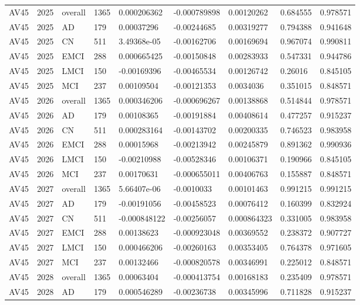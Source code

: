 \begin{landscape}
\begin{longtable}{lllllllll}
AV45 & 2025 & overall & 1365 & 0.000206362 & -0.000789898 & 0.00120262 & 0.684555 & 0.978571 \\
AV45 & 2025 & AD & 179 & 0.00037296 & -0.00244685 & 0.00319277 & 0.794388 & 0.941648 \\
AV45 & 2025 & CN & 511 & 3.49368e-05 & -0.00162706 & 0.00169694 & 0.967074 & 0.990811 \\
AV45 & 2025 & EMCI & 288 & 0.000665425 & -0.00150848 & 0.00283933 & 0.547331 & 0.944786 \\
AV45 & 2025 & LMCI & 150 & -0.00169396 & -0.00465534 & 0.00126742 & 0.26016 & 0.845105 \\
AV45 & 2025 & MCI & 237 & 0.00109504 & -0.00121353 & 0.0034036 & 0.351015 & 0.848571 \\
AV45 & 2026 & overall & 1365 & 0.000346206 & -0.000696267 & 0.00138868 & 0.514844 & 0.978571 \\
AV45 & 2026 & AD & 179 & 0.00108365 & -0.00191884 & 0.00408614 & 0.477257 & 0.915237 \\
AV45 & 2026 & CN & 511 & 0.000283164 & -0.00143702 & 0.00200335 & 0.746523 & 0.983958 \\
AV45 & 2026 & EMCI & 288 & 0.00015968 & -0.00213942 & 0.00245879 & 0.891362 & 0.990936 \\
AV45 & 2026 & LMCI & 150 & -0.00210988 & -0.00528346 & 0.00106371 & 0.190966 & 0.845105 \\
AV45 & 2026 & MCI & 237 & 0.00170631 & -0.000655011 & 0.00406763 & 0.155887 & 0.848571 \\
AV45 & 2027 & overall & 1365 & 5.66407e-06 & -0.0010033 & 0.00101463 & 0.991215 & 0.991215 \\
AV45 & 2027 & AD & 179 & -0.00191056 & -0.00458523 & 0.00076412 & 0.160399 & 0.832924 \\
AV45 & 2027 & CN & 511 & -0.000848122 & -0.00256057 & 0.000864323 & 0.331005 & 0.983958 \\
AV45 & 2027 & EMCI & 288 & 0.00138623 & -0.000923048 & 0.00369552 & 0.238372 & 0.907727 \\
AV45 & 2027 & LMCI & 150 & 0.000466206 & -0.00260163 & 0.00353405 & 0.764378 & 0.971605 \\
AV45 & 2027 & MCI & 237 & 0.00132466 & -0.000820578 & 0.00346991 & 0.225012 & 0.848571 \\
AV45 & 2028 & overall & 1365 & 0.00063404 & -0.000413754 & 0.00168183 & 0.235409 & 0.978571 \\
AV45 & 2028 & AD & 179 & 0.000546289 & -0.00236738 & 0.00345996 & 0.711828 & 0.915237 \\

\end{longtable}
\end{landscape}
